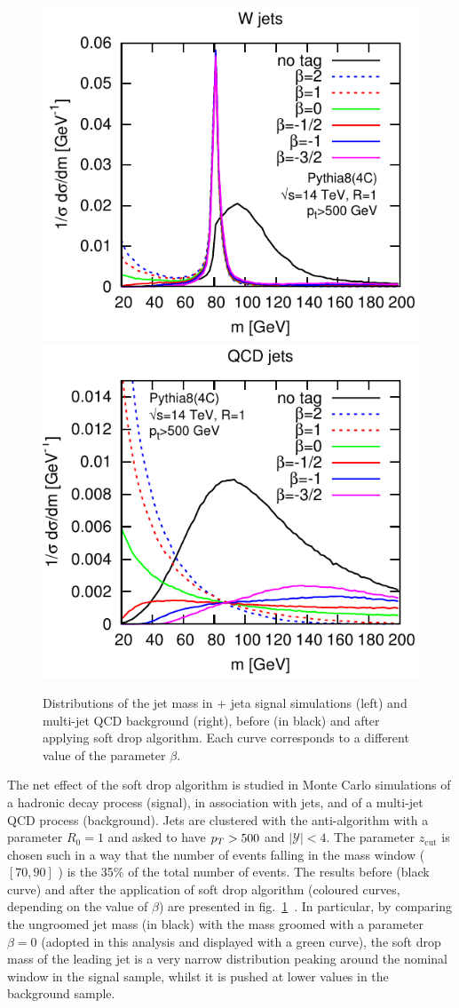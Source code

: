 \begin{figure}[!htb]
  \begin{center}
    \includegraphics[width=.495\textwidth]{figures/Wtagging_W_spectrum.pdf}
    \includegraphics[width=.495\textwidth]{figures/Wtagging_j_spectrum.pdf}
  \end{center}
  \caption{Distributions of the jet mass in \W + jeta signal simulations (left) and multi-jet QCD background (right), before (in black) and after applying soft drop algorithm. Each curve corresponds to a different value of the parameter $\beta$.~\cite{Larkoski:2014wba}}
  \label{fig:softdrop_original}
\end{figure}

\noindent The net effect of the soft drop algorithm is studied in Monte Carlo simulations of a \W hadronic decay process (signal), in association with jets, and of a multi-jet QCD process (background). Jets are clustered with the anti-\kt algorithm with a parameter $R_0 = 1$ and asked to have $p_T>500$ \GeV and $|\mathcal{Y}|<4$. The parameter $z_{\text{cut}}$ is chosen such in a way that the number of events falling in the \W mass window ($[70,90]$ \GeV) is the 35\% of the total number of events. The results before (black curve) and after the application of soft drop algorithm (coloured curves, depending on the value of $\beta$) are presented in fig.~\ref{fig:softdrop_original}~\cite{Larkoski:2014wba}. In particular, by comparing the ungroomed jet mass (in black) with the mass groomed with a parameter $\beta = 0$ (adopted in this analysis and displayed with a green curve), the soft drop mass of the leading jet is a very narrow distribution peaking around the nominal \W window in the signal sample, whilst it is pushed at lower values in the background sample.

